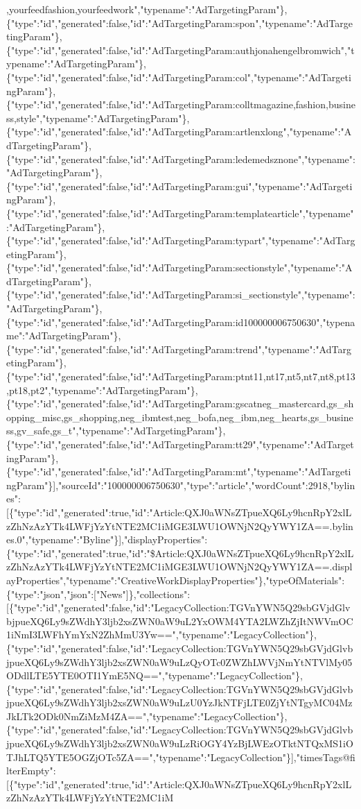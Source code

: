 ,yourfeedfashion,yourfeedwork","typename":"AdTargetingParam"\},\{"type":"id","generated":false,"id":"AdTargetingParam:spon","typename":"AdTargetingParam"\},\{"type":"id","generated":false,"id":"AdTargetingParam:authjonahengelbromwich","typename":"AdTargetingParam"\},\{"type":"id","generated":false,"id":"AdTargetingParam:col","typename":"AdTargetingParam"\},\{"type":"id","generated":false,"id":"AdTargetingParam:colltmagazine,fashion,business,style","typename":"AdTargetingParam"\},\{"type":"id","generated":false,"id":"AdTargetingParam:artlenxlong","typename":"AdTargetingParam"\},\{"type":"id","generated":false,"id":"AdTargetingParam:ledemedsznone","typename":"AdTargetingParam"\},\{"type":"id","generated":false,"id":"AdTargetingParam:gui","typename":"AdTargetingParam"\},\{"type":"id","generated":false,"id":"AdTargetingParam:templatearticle","typename":"AdTargetingParam"\},\{"type":"id","generated":false,"id":"AdTargetingParam:typart","typename":"AdTargetingParam"\},\{"type":"id","generated":false,"id":"AdTargetingParam:sectionstyle","typename":"AdTargetingParam"\},\{"type":"id","generated":false,"id":"AdTargetingParam:si\_sectionstyle","typename":"AdTargetingParam"\},\{"type":"id","generated":false,"id":"AdTargetingParam:id100000006750630","typename":"AdTargetingParam"\},\{"type":"id","generated":false,"id":"AdTargetingParam:trend","typename":"AdTargetingParam"\},\{"type":"id","generated":false,"id":"AdTargetingParam:ptnt11,nt17,nt5,nt7,nt8,pt13,pt18,pt2","typename":"AdTargetingParam"\},\{"type":"id","generated":false,"id":"AdTargetingParam:gscatneg\_mastercard,gs\_shopping\_misc,gs\_shopping,neg\_ibmtest,neg\_bofa,neg\_ibm,neg\_hearts,gs\_business,gv\_safe,gs\_t","typename":"AdTargetingParam"\},\{"type":"id","generated":false,"id":"AdTargetingParam:tt29","typename":"AdTargetingParam"\},\{"type":"id","generated":false,"id":"AdTargetingParam:mt","typename":"AdTargetingParam"\}{]},"sourceId":"100000006750630","type":"article","wordCount":2918,"bylines":{[}\{"type":"id","generated":true,"id":"Article:QXJ0aWNsZTpueXQ6Ly9hcnRpY2xlLzZhNzAzYTk4LWFjYzYtNTE2MC1iMGE3LWU1OWNjN2QyYWY1ZA==.bylines.0","typename":"Byline"\}{]},"displayProperties":\{"type":"id","generated":true,"id":"\$Article:QXJ0aWNsZTpueXQ6Ly9hcnRpY2xlLzZhNzAzYTk4LWFjYzYtNTE2MC1iMGE3LWU1OWNjN2QyYWY1ZA==.displayProperties","typename":"CreativeWorkDisplayProperties"\},"typeOfMaterials":\{"type":"json","json":{[}"News"{]}\},"collections":{[}\{"type":"id","generated":false,"id":"LegacyCollection:TGVnYWN5Q29sbGVjdGlvbjpueXQ6Ly9sZWdhY3ljb2xsZWN0aW9uL2YxOWM4YTA2LWZhZjItNWVmOC1iNmI3LWFhYmYxN2ZhMmU3Yw==","typename":"LegacyCollection"\},\{"type":"id","generated":false,"id":"LegacyCollection:TGVnYWN5Q29sbGVjdGlvbjpueXQ6Ly9sZWdhY3ljb2xsZWN0aW9uLzQyOTc0ZWZhLWVjNmYtNTVlMy05ODdlLTE5YTE0OTI1YmE5NQ==","typename":"LegacyCollection"\},\{"type":"id","generated":false,"id":"LegacyCollection:TGVnYWN5Q29sbGVjdGlvbjpueXQ6Ly9sZWdhY3ljb2xsZWN0aW9uLzU0YzJkNTFjLTE0ZjYtNTgyMC04MzJkLTk2ODk0NmZiMzM4ZA==","typename":"LegacyCollection"\},\{"type":"id","generated":false,"id":"LegacyCollection:TGVnYWN5Q29sbGVjdGlvbjpueXQ6Ly9sZWdhY3ljb2xsZWN0aW9uLzRiOGY4YzBjLWEzOTktNTQxMS1iOTJhLTQ5YTE5OGZjOTc5ZA==","typename":"LegacyCollection"\}{]},"timesTags@filterEmpty":{[}\{"type":"id","generated":true,"id":"Article:QXJ0aWNsZTpueXQ6Ly9hcnRpY2xlLzZhNzAzYTk4LWFjYzYtNTE2MC1iM